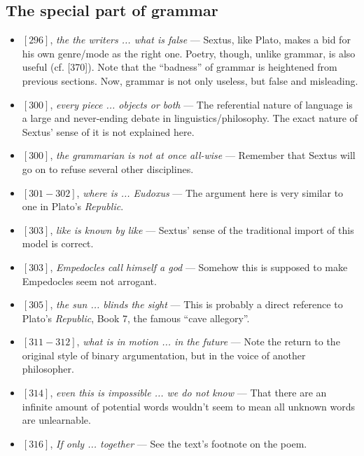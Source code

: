 \documentclass[12pt]{article}
\begin{document}
\subsection{The special part of grammar}

\begin{itemize}

\item $[296]$, \textit{the the writers ... what is false} --- Sextus, like Plato, makes a bid for his own genre/mode as the right one. Poetry, though, unlike grammar, is also useful (cf. [370]). Note that the ``badness'' of grammar is heightened from previous sections. Now, grammar is not only useless, but false and misleading.

\item $[300]$, \textit{every piece ... objects or both} --- The referential nature of language is a large and never-ending debate in linguistics/philosophy. The exact nature of Sextus' sense of it is not explained here.

\item $[300]$, \textit{the grammarian is not at once all-wise} --- Remember that Sextus will go on to refuse several other disciplines.

\item $[301-302]$, \textit{where is ... Eudoxus} --- The argument here is very similar to one in Plato's \textit{Republic}.

\item $[303]$, \textit{like is known by like} --- Sextus' sense of the traditional import of this model is correct.

\item $[303]$, \textit{Empedocles call himself a god} --- Somehow this is supposed to make Empedocles seem not arrogant.

\item $[305]$, \textit{the sun ... blinds the sight} --- This is probably a direct reference to Plato's \textit{Republic}, Book 7, the famous ``cave allegory''.

\item $[311-312]$, \textit{what is in motion ... in the future} --- Note the return to the original style of binary argumentation, but in the voice of another philosopher.

\item $[314]$, \textit{even this is impossible ... we do not know} --- That there are an infinite amount of potential words wouldn't seem to mean all unknown words are unlearnable.

\item $[316]$, \textit{If only ... together} --- See the text's footnote on the poem.
 
\end{itemize}
\end{document}
